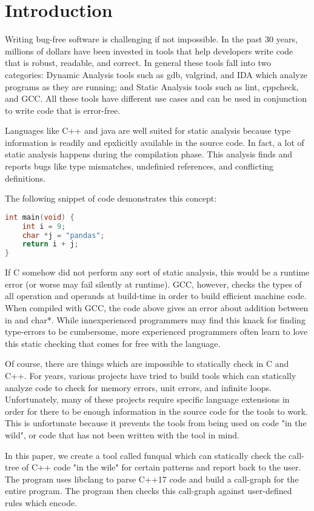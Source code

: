 \chapter{Introduction}

Writing bug-free software is challenging if not impossible.  In the past 30 years, millions of dollars have been invested in tools that help developers write code that is robust, readable, and correct.  In general these tools fall into two categories:  Dynamic Analysis tools such as gdb, valgrind, and IDA which analyze programs as they are running; and Static Analysis tools such as lint, cppcheck, and GCC.  All these tools have different use cases and can be used in conjunction to write code that is error-free.

Languages like C++ and java are well suited for static analysis because type information is readily and epxlicitly available in the source code.  In fact, a lot of static analysis happens during the compilation phase.  This analysis finds and reports bugs like type mismatches, undefinied references, and conflicting definitions.  

The following snippet of code demonstrates this concept:

\begin{lstlisting}[language=C]
int main(void) {
	int i = 9;
	char *j = "pandas";
	return i + j;
}
\end{lstlisting}

If C somehow did not perform any sort of static analysis, this would be a runtime error (or worse may fail silently at runtime).  GCC, however, checks the types of all operation and operands at build-time in order to build efficient machine code.  When compiled with GCC, the code above gives an error about addition between in and char*.  While innexperienced programmers may find this knack for finding type-errors to be cumbersome, more experienced programmers often learn to love this static checking that comes for free with the language.

Of course, there are things which are impossible to statically check in C and C++.  For years, various projects have tried to build tools which can statically analyze code to check for memory errors, unit errors, and infinite loops.  Unfortunately, many of these projects require specific language extensions in order for there to be enough information in the source code for the tools to work.  This is unfortunate because it prevents the tools from being used on code "in the wild", or code that has not been written with the tool in mind.

In this paper, we create a tool called funqual which can statically check the call-tree of C++ code "in the wile" for certain patterns and report back to the user.  The program uses libclang to parse C++17 code and build a call-graph for the entire program.  The program then checks this call-graph against user-defined rules which encode.
